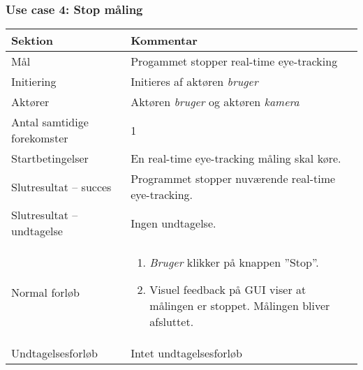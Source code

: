 \documentclass[kravspec.tex]{subfiles}
\begin{document}
	\subsubsection{Use case 4: Stop måling}
		\begin{tabular}{|l|p{7.7cm}|}
			\hline \textbf{Sektion} 	& \textbf{Kommentar} \\ 
			\hline Mål  & Progammet stopper real-time eye-tracking \\ 
			\hline Initiering  & Initieres af aktøren \textit{bruger} \\ 
			\hline Aktører & Aktøren \textit{bruger} og aktøren \textit{kamera} \\ 
			\hline Antal samtidige forekomster & 1 \\ 
			\hline Startbetingelser & En real-time eye-tracking måling  skal køre.   \\ 
			\hline Slutresultat – succes & Programmet stopper nuværende real-time eye-tracking.\\ 
			\hline Slutresultat – undtagelse & Ingen undtagelse. \\ 
			\hline Normal forløb & \begin{enumerate}
				\item \textit{Bruger} klikker på knappen ”Stop”.
				\item Visuel feedback på GUI viser at målingen er stoppet. Målingen bliver afsluttet. 
			\end{enumerate} \\ 
			\hline Undtagelsesforløb & Intet undtagelsesforløb \\ 
			\hline 
		\end{tabular}
\end{document}
